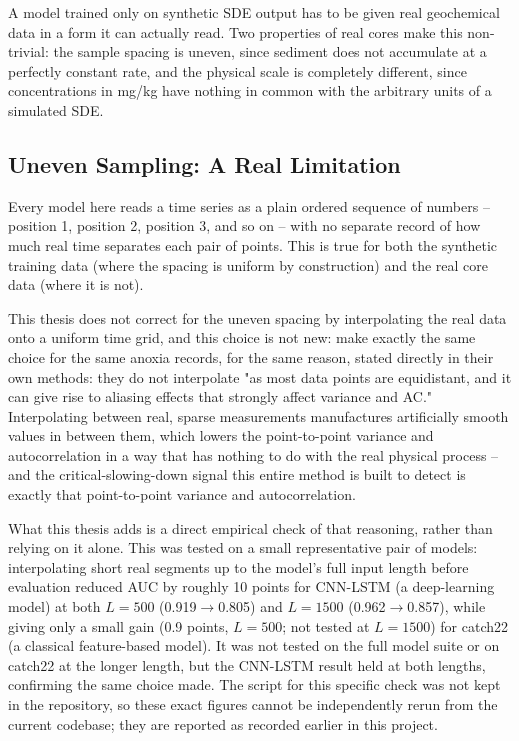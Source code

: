 A model trained only on synthetic SDE output has to be given real geochemical data in a form it can actually read. Two properties of real cores make this non-trivial: the sample spacing is uneven, since sediment does not accumulate at a perfectly constant rate, and the physical scale is completely different, since concentrations in mg/kg have nothing in common with the arbitrary units of a simulated SDE.

\subsection{Uneven Sampling: A Real Limitation}

Every model here reads a time series as a plain ordered sequence of numbers -- position 1, position 2, position 3, and so on -- with no separate record of how much real time separates each pair of points. This is true for both the synthetic training data (where the spacing is uniform by construction) and the real core data (where it is not).

This thesis does not correct for the uneven spacing by interpolating the real data onto a uniform time grid, and this choice is not new: \citet{bury2021} make exactly the same choice for the same anoxia records, for the same reason, stated directly in their own methods: they do not interpolate "as most data points are equidistant, and it can give rise to aliasing effects that strongly affect variance and AC." Interpolating between real, sparse measurements manufactures artificially smooth values in between them, which lowers the point-to-point variance and autocorrelation in a way that has nothing to do with the real physical process -- and the critical-slowing-down signal this entire method is built to detect is exactly that point-to-point variance and autocorrelation.

What this thesis adds is a direct empirical check of that reasoning, rather than relying on it alone. This was tested on a small representative pair of models: interpolating short real segments up to the model's full input length before evaluation reduced AUC by roughly 10 points for CNN-LSTM (a deep-learning model) at both $L=500$ (0.919$\to$0.805) and $L=1500$ (0.962$\to$0.857), while giving only a small gain (0.9 points, $L=500$; not tested at $L=1500$) for catch22 (a classical feature-based model). It was not tested on the full model suite or on catch22 at the longer length, but the CNN-LSTM result held at both lengths, confirming the same choice \citet{bury2021} made. The script for this specific check was not kept in the repository, so these exact figures cannot be independently rerun from the current codebase; they are reported as recorded earlier in this project.

